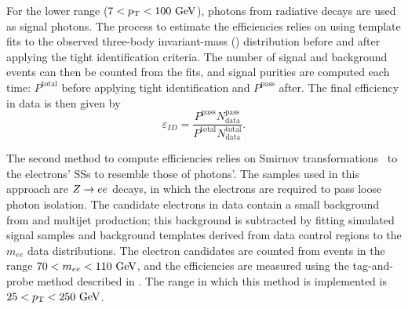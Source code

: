 For the lower \pt range (\(7<p_{\text{T}}<100~\text{GeV}\)), photons from radiative \Zboson decays are used as signal photons.
The process to estimate the efficiencies relies on using template fits to the observed three-body invariant-mass (\mlly) distribution before and after applying the tight identification criteria. The number of signal and background events can then be counted from the fits, and signal purities are computed each time: \(P^{\text{total}}\) before applying tight identification and \(P^{\text{pass}}\) after.
The final efficiency in data is then given by
\begin{equation}
    \varepsilon_{ID} = \frac{ P^{\text{pass}} N_{\text{data}}^{\text{pass}} }{ P^{\text{total}} N_{\text{data}}^{\text{total}} }.
\end{equation}

The second method to compute efficiencies relies on Smirnov transformations~\cite{SmirnovTransform} to the electrons' \acp{SS} to resemble those of photons'. The samples used in this approach are \(Z\rightarrow ee\) decays, in which the electrons are required to pass loose photon isolation. The candidate electrons in data contain a small background from \Wjets and multijet production; this background is subtracted by fitting simulated signal samples and background templates derived from data control regions to the \(m_{ee}\) data distributions. The electron candidates are counted from events in the range \(70 < m_{ee} < 110~\text{GeV}\), and the efficiencies are measured using the tag-and-probe method described in . The \pt range in which this method is implemented is \(25<p_{\text{T}}<250~\text{GeV}\).

